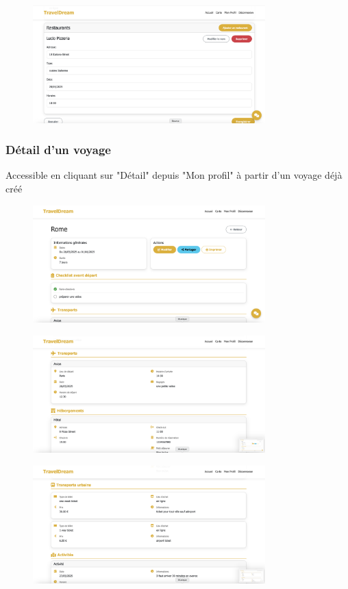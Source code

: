 \documentclass[a4paper,12pt]{article}
\begin{document}
\begin{figure}[H]
    \centering
    \includegraphics[width=0.8\textwidth]{8_creation_voyage_7.png}
\end{figure}


\subsubsection{Détail d'un voyage}
Accessible en cliquant sur "Détail" depuis "Mon profil" à partir d'un voyage déjà créé
\begin{figure}[H]
    \centering
    \includegraphics[width=0.8\textwidth]{9_detail_voyage_1.png}
\end{figure}
\begin{figure}[H]
    \centering
    \includegraphics[width=0.8\textwidth]{9_detail_voyage_2.png}
\end{figure}
\begin{figure}[H]
    \centering
    \includegraphics[width=0.8\textwidth]{9_detail_voyage_3.png}
\end{figure}
\end{document}
